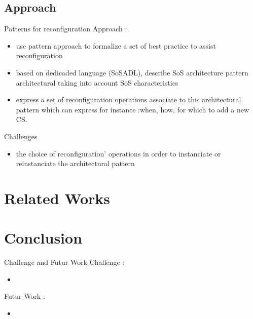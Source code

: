 \documentclass[notes]{beamer}
\begin{document}
\subsection{Approach}
\begin{frame}{Patterns for reconfiguration}
  Approach :
  \begin{itemize}
  \item use pattern approach to formalize a set of best practice to assist
    reconfiguration
  \end{itemize}

  \begin{itemize}
  \item based on dedicaded language (SoSADL), describe SoS architecture
    pattern architectural taking into account SoS characteristics
  \item express a set of reconfiguration operations associate to this
    architectural pattern which can express for instance :when, how,
    for which to add a new CS.
  \end{itemize}
\end{frame}


\begin{frame}{Challenges}
  \begin{itemize}
  \item the choice of reconfiguration' operations in order to instanciate or reinstanciate the architectural pattern
  \end{itemize}
\end{frame}


\section{Related Works}

\begin{frame}{}
\end{frame}

\section{Conclusion}

\begin{frame}{Challenge and Futur Work}
  Challenge : 
  \begin{itemize}
  \item
  \end{itemize}

  Futur Work :
  \begin{itemize}
  \item
  \end{itemize}
\end{frame}
\end{document}
